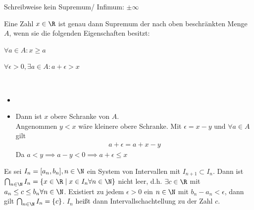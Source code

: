 Schreibweise kein Supremum/ Infimum: $\pm \infty$
\begin{theorem}
	Eine Zahl $x\in \R$ ist genau dann Supremum der nach oben beschränkten Menge $A$, wenn sie die folgenden Eigenschaften besitzt:
	\begin{enumerateroman}
		\item $\forall a\in A: x \geq a$
		\item $\forall \epsilon > 0, \exists a \in A: a+\epsilon > x$
	\end{enumerateroman}
\end{theorem}
\prove \
\begin{itemize}
	\item[$\Rightarrow$]
	\item[$\Leftarrow$] Dann ist $x$ obere Schranke von $A$.\\ Angenommen $y<x$ wäre kleinere obere Schranke. Mit $\epsilon=x-y$ und $\forall a \in A$ gilt \begin{align*}
		      a+\epsilon=a+x-y
	      \end{align*}
	      Da $a<y\implies a-y<0\implies a+\epsilon\leq x$\lightning
\end{itemize}

\begin{theorem}[Intervallschachtellung]
	Es sei $I_n=[a_n, b_n], n\in \N$ ein System von Intervallen mit $I_{n+1}\subset I_n$. Dann ist $\bigcap_{n\in \N}I_n=\{x\in \R\mid x\in I_n \forall n\in \N\}$ nicht leer, d.h. $\exists c \in \R$ mit $a_n\leq c\leq b_n \forall n \in \N$. Existiert zu jedem $\epsilon >0$ ein $n\in\N$ mit $b_n-a_n<\epsilon$, dann gilt $\bigcap_{n\in\N} I_n = \{c\}$. $I_n$ heißt dann Intervallschachtellung zu der Zahl $c$.
\end{theorem}
